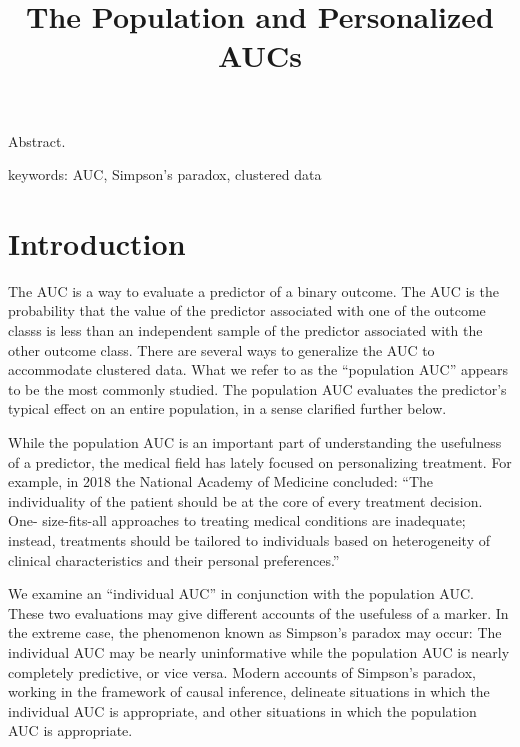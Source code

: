 \message{ !name(manuscript.tex)}\documentclass[12pt]{article}
\title{The Population and Personalized AUCs}
\begin{document}


\maketitle
Abstract.


keywords: AUC, Simpson's paradox, clustered data

\section{Introduction}
The AUC is a way to evaluate a predictor of a binary outcome. The AUC
is the probability that the value of the predictor associated with one
of the outcome classs is less than an independent sample of the
predictor associated with the other outcome class. There are several
ways to generalize the AUC to accommodate clustered data. What we
refer to as the ``population AUC'' appears to be the most commonly
studied. The population AUC evaluates the predictor's typical effect
on an entire population, in a sense clarified further below.

While the population AUC is an important part of understanding the
usefulness of a predictor, the medical field has lately focused on
personalizing treatment. %
For example, in 2018 the National Academy of Medicine concluded: ``The
individuality of the patient should be at the core of every treatment
decision. One- size-fits-all approaches to treating medical conditions
are inadequate; instead, treatments should be tailored to individuals
based on heterogeneity of clinical characteristics and their personal
preferences.''

We examine an ``individual AUC'' in conjunction with the population
AUC.  These two evaluations may give different accounts of the
usefuless of a marker. In the extreme case, the phenomenon known as
Simpson's paradox may occur: The individual AUC may be nearly
uninformative while the population AUC is nearly completely
predictive, or vice versa. Modern accounts of Simpson's paradox,
working in the framework of causal inference, delineate situations in
which the individual AUC is appropriate, and other situations in which
the population AUC is appropriate. 
  
\end{document}
